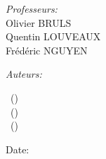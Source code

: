 \begin{titlepage}

\begin{center}
    \begin{minipage}{0.45\linewidth} %
        \raggedright %
        \normalsize \textit{Professeurs:} \\
            \small  Olivier BRULS \\
                    Quentin LOUVEAUX \\
                    Frédéric NGUYEN 
    \end{minipage}
    \begin{minipage}{0.45\linewidth} %
        \raggedleft %
        \normalsize \textit{Auteurs:} \\
        \begin{small}
            \reportauthorOne~(\cidOne)\\
            \reportauthorTwo~(\cidTwo)\\
            \reportauthorThree~(\cidThree)\\
        \end{small}
    \end{minipage}
\end{center}


\vspace{4cm}
\makeatletter
Date: \@date 

\vfill %



\makeatother

\end{titlepage}

